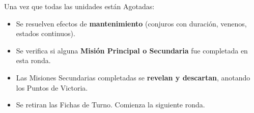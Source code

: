 Una vez que todas las unidades están Agotadas:

\begin{itemize}
    \item Se resuelven efectos de \textbf{mantenimiento} (conjuros con duración, venenos, estados continuos).
    \item Se verifica si alguna \textbf{Misión Principal o Secundaria} fue completada en esta ronda.
    \item Las Misiones Secundarias completadas se \textbf{revelan y descartan}, anotando los Puntos de Victoria.
    \item Se retiran las Fichas de Turno. Comienza la siguiente ronda.
\end{itemize}
